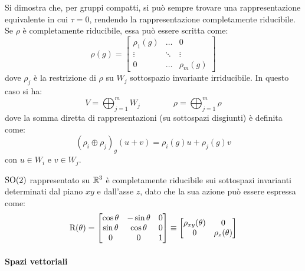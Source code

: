 Si dimostra che, per gruppi compatti, si può sempre trovare una rappresentazione equivalente in cui $ \tau = 0 $, rendendo la rappresentazione completamente riducibile.\\
Se $ \rho $ è completamente riducibile, essa può essere scritta come:
\begin{equation}
	\rho(g) =
	\begin{bmatrix}
		\rho_1(g) & \dots & 0 \\
		\vdots & \ddots & \vdots \\
		0 & \dots & \rho_m(g)
	\end{bmatrix}
	\label{eq:8.3}
\end{equation}
dove $ \rho_j $ è la restrizione di $ \rho $ su $ W_j $ sottospazio invariante irriducibile. In questo caso si ha:
\begin{equation}
	V = \bigoplus_{j = 1}^{m} W_j
	\qquad \qquad
	\rho = \bigoplus_{j = 1}^{m} \rho
	\label{eq:8.4}
\end{equation}
dove la somma diretta di rappresentazioni (su sottospazi disgiunti) è definita come:
\begin{equation}
	(\rho_i \oplus \rho_j)_g (u + v) = \rho_i(g) u + \rho_j(g) v
	\label{eq:8.5}
\end{equation}
con $ u \in W_i $ e $ v \in W_j $.

\begin{example}
	$ \mathrm{SO}(2) $ rappresentato su $ \mathbb{R}^3 $ è completamente riducibile sui sottospazi invarianti determinati dal piano $ xy $ e dall'asse $ z $, dato che la sua azione può essere espressa come:
	\begin{equation}
		\mathrm{R}(\theta) =
		\begin{bmatrix}
			\cos \theta & - \sin \theta & 0 \\
			\sin \theta & \cos \theta & 0 \\
			0 & 0 & 1
		\end{bmatrix}
		\equiv
		\begin{bmatrix}
			\rho_{xy}(\theta) & 0 \\
			0 & \rho_z(\theta)
		\end{bmatrix}
	\end{equation}
\end{example}

\paragraph{Spazi vettoriali}

